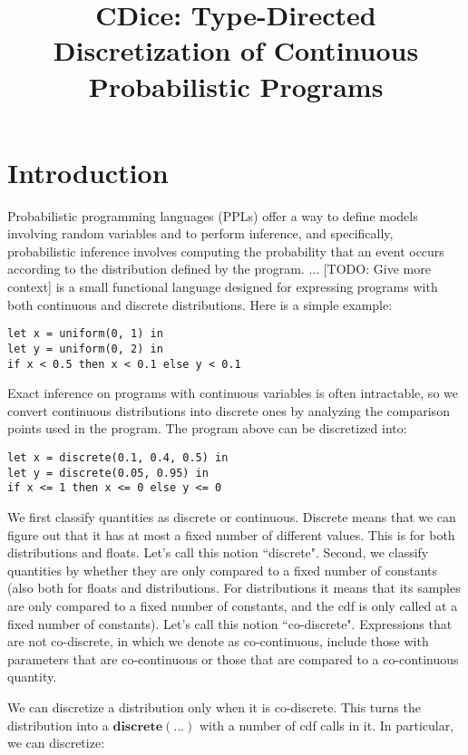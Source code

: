 \documentclass[acmsmall,screen,dvipsnames,x11names,nonacm,anonymous,review]{acmart}
\title{CDice: Type-Directed Discretization of Continuous Probabilistic Programs}
\newcommand{\CDice}{\text{\scshape CDice}\xspace}
\begin{document}
\maketitle


\section{Introduction}
Probabilistic programming languages (PPLs) offer a way to define models involving random variables and to perform inference, and specifically, probabilistic inference involves computing the probability that an event occurs according to the distribution defined by the program. ... [TODO: Give more context] \CDice is a small functional language designed for expressing programs with both continuous and discrete distributions. Here is a simple example:

\begin{lstlisting}
let x = uniform(0, 1) in
let y = uniform(0, 2) in
if x < 0.5 then x < 0.1 else y < 0.1
\end{lstlisting}


Exact inference on programs with continuous variables is often intractable, so we convert continuous distributions into discrete ones by analyzing the comparison points used in the program. The program above can be discretized into:

\begin{lstlisting}
let x = discrete(0.1, 0.4, 0.5) in
let y = discrete(0.05, 0.95) in
if x <= 1 then x <= 0 else y <= 0
\end{lstlisting}


We first classify quantities as discrete or continuous. Discrete means that we can figure out that it has at most a fixed number of different values. This is for both distributions and floats. Let's call this notion ``discrete". Second, we classify quantities by whether they are only compared to a fixed number of constants (also both for floats and distributions. For distributions it means that its samples are only compared to a fixed number of constants, and the cdf is only called at a fixed number of constants). Let's call this notion ``co-discrete". Expressions that are not co-discrete, in which we denote as co-continuous, include those with parameters that are co-continuous or those that are compared to a co-continuous quantity.

We can discretize a distribution only when it is co-discrete. This turns the distribution into a $\mathbf{discrete(...)}$ with a number of cdf calls in it. In particular, we can discretize:
\end{document}
